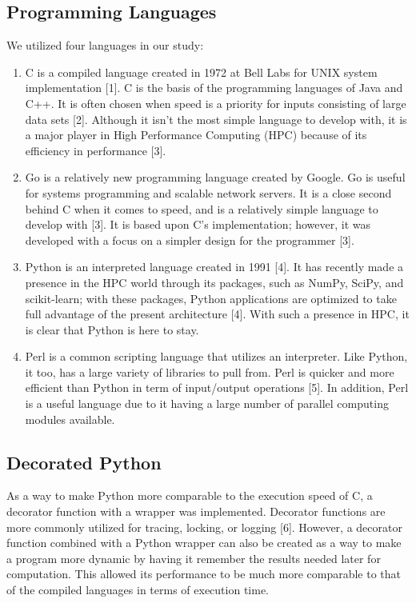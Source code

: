 \documentclass{sig-alternate}
\begin{document}
\subsection{Programming Languages}	

We utilized four languages in our study:

\begin{enumerate}
\item {\em}C is a compiled language created in 1972 at Bell Labs for UNIX system implementation [1]. C is the basis of the programming languages of Java and C++. It is often chosen when speed is a priority for inputs consisting of large data sets [2]. Although it isn't the most simple language to develop with, it is a major player in High Performance Computing (HPC) because of its efficiency in performance [3].
\item {\em}Go is a relatively new programming language created by Google. Go is useful for systems programming and scalable network servers. It is a close second behind C when it comes to speed, and is a relatively simple language to develop with [3]. It is based upon C's implementation; however, it was developed with a focus on a simpler design for the programmer [3]. 
\item {\em}Python is an interpreted language created in 1991 [4]. It has recently made a presence in the HPC world through its packages, such as NumPy, SciPy, and scikit-learn; with these packages, Python applications are optimized to take full 
advantage of the present architecture [4]. With such a presence in HPC, it is clear that Python is here to stay.
\item  {\em}Perl is a common scripting language that utilizes an interpreter. Like Python, it too, has a large variety of libraries to pull from. Perl is quicker and more efficient than Python in term of input/output operations [5]. In addition, Perl is a useful language due to it having a large number of parallel computing modules available.
\end{enumerate}


\subsection{Decorated Python}

As a way to make Python more comparable to the execution speed of C, a decorator function with a wrapper was implemented. Decorator functions are more commonly utilized for tracing, locking, or logging [6]. However, a decorator function combined with a Python wrapper can also be created as a way to make a program more dynamic by having it remember the results needed later for computation. This allowed its performance to be much more comparable to that of the compiled languages in terms of execution time.
\end{document}
